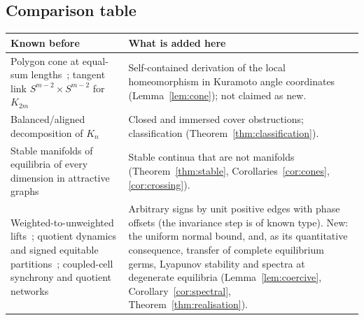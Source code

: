 \documentclass[11pt,a4paper]{article}
\theoremstyle{definition}\newtheorem{conjecture}{Conjecture}
\theoremstyle{remark}\newtheorem{remark}[theorem]{Remark}
\begin{document}
\subsection{Comparison table}
\begin{center}\small
\begin{tabular}{p{4.4cm}p{9.6cm}}\toprule
Known before & What is added here\\\midrule
Polygon cone at equal-sum lengths~\cite{kamiyama,kapovichmillson}; tangent link $S^{m-2}\times S^{m-2}$ for $K_{2m}$~\cite{burns} & Self-contained derivation of the local homeomorphism in Kuramoto angle coordinates (Lemma~\ref{lem:cone}); not claimed as new.\\
Balanced/aligned decomposition of $K_n$~\cite{hss,sclosa23} & Closed and immersed cover obstructions; classification (Theorem~\ref{thm:classification}).\\
Stable manifolds of equilibria of every dimension in attractive graphs~\cite{sclosa23} & Stable continua that are not manifolds (Theorem~\ref{thm:stable}, Corollaries~\ref{cor:cones}, \ref{cor:crossing}).\\
Weighted-to-unweighted lifts~\cite{canale}; quotient dynamics and signed equitable partitions~\cite{schaub}; coupled-cell synchrony and quotient networks~\cite{sgp,gst,gs} & Arbitrary signs by unit positive edges with phase offsets (the invariance step is of known type). New: the uniform normal bound, and, as its quantitative consequence, transfer of complete equilibrium germs, Lyapunov stability and spectra at degenerate equilibria (Lemma~\ref{lem:coercive}, Corollary~\ref{cor:spectral}, Theorem~\ref{thm:realisation}).\\\bottomrule
\end{tabular}
\end{center}
\end{document}
